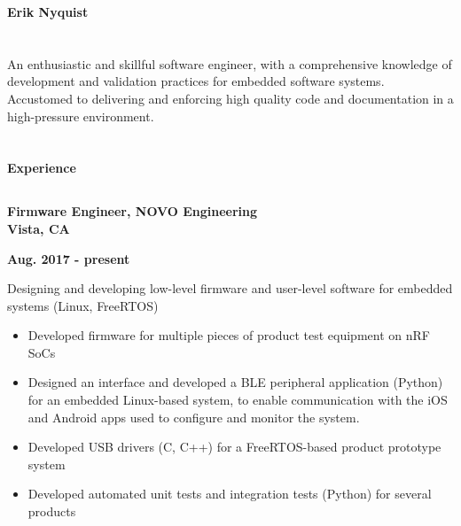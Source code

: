 \documentclass[6pt]{article}
\begin{document}
%
%
\begin{minipage}{35em}
%
%
{\Huge \bfseries Erik Nyquist}
\section*{}

An enthusiastic and skillful software engineer, with a comprehensive knowledge of
development and validation practices for embedded software systems. Accustomed to
delivering and enforcing high quality code and documentation in a high-pressure
environment.

\section*{}
{\Large \bfseries Experience}
%
%
\subsection*{}
\hspace*{-\parindent}%
\begin{minipage}{20em}
{\bfseries Firmware Engineer, NOVO Engineering \\
Vista, CA}
\end{minipage}
\hfill
\begin{minipage}{10em}
{
    \bfseries \hfill Aug. 2017 - present \\

}
\end{minipage}
\break
\break
Designing and developing low-level firmware and user-level software for embedded
systems (Linux, FreeRTOS)
\begin{itemize}
    \item Developed firmware for multiple pieces of product test equipment on nRF SoCs
    \item Designed an interface and developed a BLE peripheral application (Python) for an
          embedded Linux-based system, to enable communication with the iOS and Android
          apps used to configure and monitor the system.
    \item Developed USB drivers (C, C++) for a FreeRTOS-based product prototype system
    \item Developed automated unit tests and integration tests (Python) for several products
\end{itemize}
\hspace*{-\parindent}%
\begin{minipage}{20em}
%
%

\end{minipage}
\end{minipage}
\end{document}
